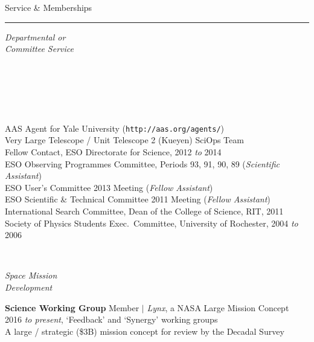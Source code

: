 \documentclass[11pt]{article}
\makeatletter
\def\vhrulefill#1{\leavevmode\leaders\hrule\@height#1\hfill \kern\z@}
\makeatother
\begin{document}
\vspace{4mm}

\clearpage

{\sc Service \& Memberships} \vhrulefill{0.4pt}



\vspace{4mm}


\hspace{2.5mm} \parbox{1.5in}{{\it Departmental or \\Committee Service\\\\\\\\\\\\}} \parbox{5.15in}{
AAS Agent for Yale University ({\small \texttt{http://aas.org/agents/}})\\
Very Large Telescope / Unit Telescope 2 (Kueyen) SciOps Team \\
Fellow Contact, ESO Directorate for Science, 2012 {\it to} 2014 \\
ESO Observing Programmes Committee, Periods 93, 91, 90, 89 ({\it Scientific Assistant})\\  
ESO User's Committee 2013 Meeting ({\it Fellow Assistant})\\
ESO Scientific \& Technical Committee 2011 Meeting ({\it Fellow Assistant})\\
International Search Committee, Dean of the College of Science, RIT, 2011 \\
Society of Physics Students Exec.~Committee, University of Rochester, 2004 {\it to} 2006}\\

\vspace{4mm}

\hspace{2.5mm} \parbox{1.5in}{{\it Space Mission \\ Development\\} } \parbox{5.15in}{
{\bf Science Working Group} Member $|$ {\it Lynx}, a NASA Large Mission Concept \\ 2016 {\it to present},  `Feedback' and `Synergy' working groups \\ A large / strategic (\$3B) mission concept for review by the Decadal Survey } \\


\vspace{4mm}
\end{document}
